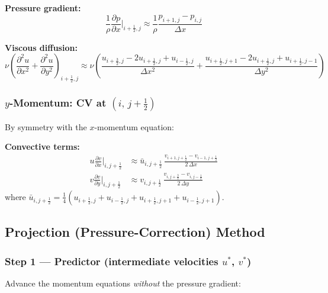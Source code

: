 \textbf{Pressure gradient:}
\begin{equation}
    \frac{1}{\rho}\frac{\partial p}{\partial x}\bigg|_{i+\frac{1}{2},j}
    \approx \frac{1}{\rho}\frac{p_{i+1,j} - p_{i,j}}{\Delta x}
\end{equation}

\textbf{Viscous diffusion:}
\begin{equation}
    \nu\!\left(\frac{\partial^2 u}{\partial x^2}
              +\frac{\partial^2 u}{\partial y^2}\right)_{i+\frac{1}{2},j}
    \approx \nu\!\left(
      \frac{u_{i+\frac{3}{2},j}-2u_{i+\frac{1}{2},j}+u_{i-\frac{1}{2},j}}{\Delta x^2}
      +\frac{u_{i+\frac{1}{2},j+1}-2u_{i+\frac{1}{2},j}+u_{i+\frac{1}{2},j-1}}{\Delta y^2}
    \right)
\end{equation}

\subsubsection{$y$-Momentum: CV at $(i,\,j+\tfrac{1}{2})$}

By symmetry with the $x$-momentum equation:

\textbf{Convective terms:}
\begin{align}
    u\frac{\partial v}{\partial x}\bigg|_{i,j+\frac{1}{2}}
    &\approx \bar{u}_{i,j+\frac{1}{2}}\,
       \frac{v_{i+1,j+\frac{1}{2}} - v_{i-1,j+\frac{1}{2}}}{2\,\Delta x}
    \\[4pt]
    v\frac{\partial v}{\partial y}\bigg|_{i,j+\frac{1}{2}}
    &\approx v_{i,j+\frac{1}{2}}\,
       \frac{v_{i,j+\frac{3}{2}} - v_{i,j-\frac{1}{2}}}{2\,\Delta y}
\end{align}
where $\bar{u}_{i,j+\frac{1}{2}}
= \tfrac{1}{4}\!\left(u_{i+\frac{1}{2},j}+u_{i-\frac{1}{2},j}
                     +u_{i+\frac{1}{2},j+1}+u_{i-\frac{1}{2},j+1}\right)$.

\subsection{Projection (Pressure-Correction) Method}

\subsubsection{Step 1 --- Predictor (intermediate velocities $u^*$, $v^*$)}

Advance the momentum equations \emph{without} the pressure gradient:

